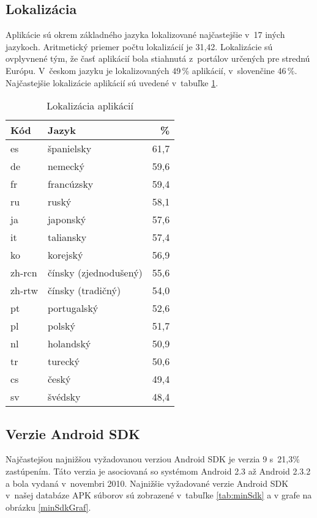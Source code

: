 \subsection{Lokalizácia}
Aplikácie sú okrem základného jazyka lokalizované najčastejšie v~17 iných jazykoch. Aritmetický priemer počtu lokalizácií je 31,42. Lokalizácie sú ovplyvnené tým, že časť aplikácií bola stiahnutá z~portálov určených pre strednú Európu. V~českom jazyku je lokalizovaných 49\,\% aplikácií, v~slovenčine 46\,\%. Najčastejšie lokalizácie aplikácií sú uvedené v~tabuľke \ref{tab:language}.
\begin{table}[htb]
\centering
  \begin{tabular}{|l l r|}
    \hline
    \textbf{Kód} & \textbf{Jazyk} &  \textbf{\%} \\\hline\hline
    es & španielsky & 61,7 \\
    de & nemecký & 59,6 \\
    fr & francúzsky & 59,4 \\
    ru & ruský & 58,1 \\
    ja & japonský & 57,6 \\
    it & taliansky & 57,4 \\
	ko & korejský & 56,9 \\
	zh-rcn & čínsky (zjednodušený) & 55,6\\
	zh-rtw & čínsky (tradičný)& 54,0\\
	pt & portugalský & 52,6\\
	pl & polský & 51,7\\
	nl & holandský & 50,9\\
	tr & turecký & 50,6\\
	cs & český & 49,4\\
	sv & švédsky & 48,4\\
    \hline
  \end{tabular}
  \caption{Lokalizácia aplikácií}
  \label{tab:language}
\end{table}

\subsection{Verzie Android SDK}

Najčastejšou najnižšou vyžadovanou verziou Android SDK je verzia 9 s~21,3\% zastúpením. Táto verzia je asociovaná so systémom Android 2.3 až Android 2.3.2  a bola vydaná v~novembri 2010. Najnižšie vyžadované verzie Android SDK v~našej databáze APK súborov sú zobrazené v~tabuľke \ref{tab:minSdk} a v grafe na obrázku \ref{minSdkGraf}.

